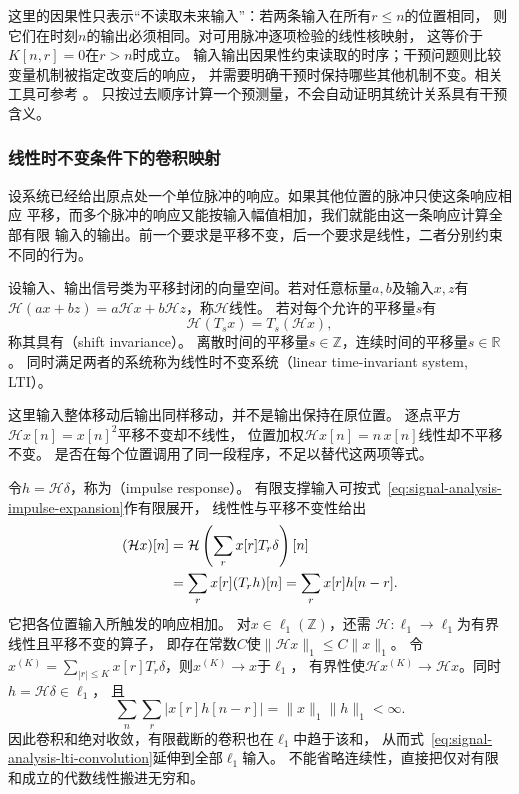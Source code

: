 这里的因果性只表示“不读取未来输入”：若两条输入在所有$r\leq n$的位置相同，
则它们在时刻$n$的输出必须相同。对可用脉冲逐项检验的线性核映射，
这等价于$K[n,r]=0$在$r>n$时成立。
输入输出因果性约束读取的时序；干预问题则比较变量机制被指定改变后的响应，
并需要明确干预时保持哪些其他机制不变。相关工具可参考
。
只按过去顺序计算一个预测量，不会自动证明其统计关系具有干预含义。

\subsubsection{线性时不变条件下的卷积映射}
\label{sec:signal-analysis-lti-convolution}

设系统已经给出原点处一个单位脉冲的响应。如果其他位置的脉冲只使这条响应相应
平移，而多个脉冲的响应又能按输入幅值相加，我们就能由这一条响应计算全部有限
输入的输出。前一个要求是平移不变，后一个要求是线性，二者分别约束不同的行为。
\begin{definition}[线性时不变系统]
  \label{def:signal-analysis-lti-system}
  设输入、输出信号类为平移封闭的向量空间。若对任意标量$a,b$及输入$x,z$有
  $\mathcal H(ax+bz)=a\mathcal Hx+b\mathcal Hz$，称$\mathcal H$线性。
  若对每个允许的平移量$s$有
  \[
    \mathcal H(T_sx)=T_s(\mathcal Hx),
  \]
  称其具有（shift invariance）。
  离散时间的平移量$s\in\mathbb Z$，连续时间的平移量$s\in\mathbb R$。
  同时满足两者的系统称为线性时不变系统（linear time-invariant system, LTI）。
\end{definition}
这里输入整体移动后输出同样移动，并不是输出保持在原位置。
逐点平方$\mathcal Hx[n]=x[n]^2$平移不变却不线性，
位置加权$\mathcal Hx[n]=n\,x[n]$线性却不平移不变。
是否在每个位置调用了同一段程序，不足以替代这两项等式。

令$h=\mathcal H\delta$，称为（impulse response）。
有限支撑输入可按式~\eqref{eq:signal-analysis-impulse-expansion}作有限展开，
线性性与平移不变性给出
\begin{align}
  (\mathcal Hx)[n]
  &=\mathcal H\left(\sum_r x[r]T_r\delta\right)[n]\notag\\
  &=\sum_r x[r](T_rh)[n]=\sum_r x[r]h[n-r].
  \label{eq:signal-analysis-lti-convolution}
\end{align}
它把各位置输入所触发的响应相加。
对$x\in\ell_1(\mathbb Z)$，还需
$\mathcal H:\ell_1\to\ell_1$为有界线性且平移不变的算子，
即存在常数$C$使$\|\mathcal Hx\|_1\leq C\|x\|_1$。
令$x^{(K)}=\sum_{|r|\leq K}x[r]T_r\delta$，则$x^{(K)}\to x$于$\ell_1$，
有界性使$\mathcal Hx^{(K)}\to\mathcal Hx$。同时$h=\mathcal H\delta\in\ell_1$，
且
\[
  \sum_n\sum_r|x[r]h[n-r]|=\|x\|_1\|h\|_1<\infty.
\]
因此卷积和绝对收敛，有限截断的卷积也在$\ell_1$中趋于该和，
从而式~\eqref{eq:signal-analysis-lti-convolution}延伸到全部$\ell_1$输入。
不能省略连续性，直接把仅对有限和成立的代数线性搬进无穷和。

